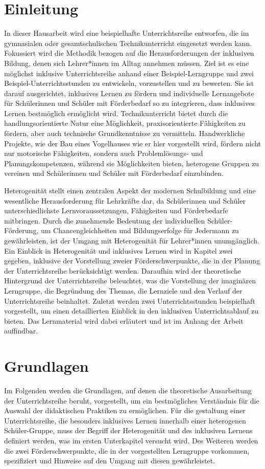 \documentclass[12pt]{article}
\begin{document}
\section{Einleitung}
In dieser Hausarbeit wird eine beispielhafte Unterrichtsreihe entworfen, die im gymnasialen oder gesamtschulischen Technikunterricht eingesetzt werden kann. Fokussiert wird die Methodik bezogen auf die Herausforderungen der inklusiven Bildung, denen sich Lehrer*innen im Alltag annehmen müssen. Ziel ist es eine möglichst inklusive Unterrichtsreihe anhand einer Beispiel-Lerngruppe und zwei Beispiel-Unterrichtsstunden zu entwickeln, vorzustellen und zu bewerten. Sie ist darauf ausgerichtet, inklusives Lernen zu fördern und individuelle Lernangebote für Schülerinnen und Schüler mit Förderbedarf so zu integrieren, dass inklusives Lernen bestmöglich ermöglicht wird. Technikunterricht bietet durch die handlungsorientierte Natur eine Möglichkeit, praxisorientierte Fähigkeiten zu fördern, aber auch technische Grundkenntnisse zu vermitteln. Handwerkliche Projekte, wie der Bau eines Vogelhauses wie er hier vorgestellt wird, fördern nicht nur motorische Fähigkeiten, sondern auch Problemlösungs- und Planungskompetenzen, während sie Möglichkeiten bieten, heterogene Gruppen zu vereinen und Schülerinnen und Schüler mit Förderbedarf einzubinden.

Heterogenität stellt einen zentralen Aspekt der modernen Schulbildung und eine wesentliche Herausforderung für Lehrkräfte dar, da Schülerinnen und Schüler unterschiedlichste Lernvoraussetzungen, Fähigkeiten und Förderbedarfe mitbringen. Durch die zunehmende Bedeutung der individuellen Schüler-Förderung, um Chancengleichheiten und Bildungserfolge für Jedermann zu gewährleisten, ist der Umgang mit Heterogenität für Lehrer*innen unumgänglich. Ein Einblick in Heterogenität und inklusives Lernen wird in Kapitel zwei gegeben, inklusive der Vorstellung zweier Förderschwerpunkte, die in der Planung der Unterrichtsreihe berücksichtigt werden. Daraufhin wird der theoretische Hintergrund der Unterrichtsreihe beleuchtet, was die Vorstellung der imaginären Lerngruppe, die Begründung des Themas, die Lernziele und den Verlauf der Unterrichtsreihe beinhaltet. Zuletzt werden zwei Unterrichtsstunden beispielhaft vorgestellt, um einen detaillierten Einblick in den inklusiven Unterrichtsablauf zu bieten. Das Lernmaterial wird dabei erläutert und ist im Anhang der Arbeit auffindbar.


\section{Grundlagen}
Im Folgenden werden die Grundlagen, auf denen die theoretische Ausarbeitung der Unterrichtsreihe beruht, vorgestellt, um ein bestmögliches Verständnis für die Auswahl der didaktischen Praktiken zu ermöglichen. Für die gestaltung einer Unterrichtsreihe, die besonders inklusives Lernen innerhalb einer heterogenen Schüler-Gruppe, muss der Begriff der Heterogenität und des inklusiven Lernens definiert werden, was im ersten Unterkapitel versucht wird. Des Weiteren werden die zwei Förderschwerpunkte, die in der vorgestellten Lerngruppe vorkommen, spezifiziert und Hinweise auf den Umgang mit diesen gewährleistet.
\end{document}
